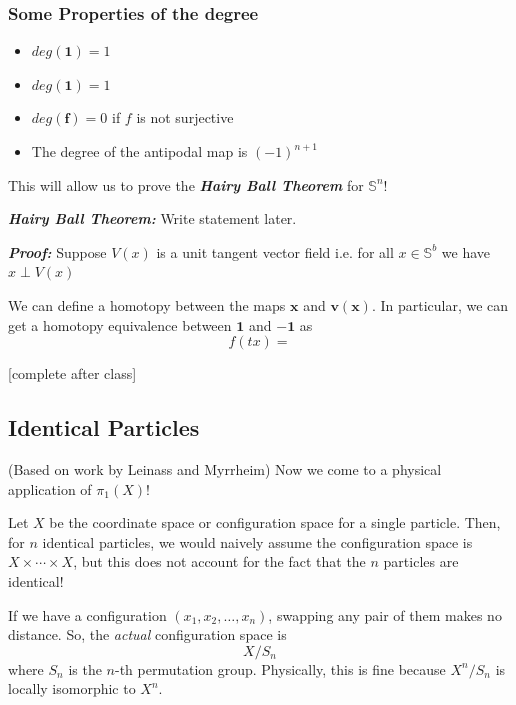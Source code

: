 \documentclass{article}
\begin{document}
\vskip 0.5cm
\subsubsection*{Some Properties of the degree}

\begin{itemize}
  \item $deg(\mathbf{1}) = 1$
  \item $deg(\mathbf{1}) = 1$
  \item $deg(\mathbf{f}) = 0$ if $f$ is not surjective
  \item The degree of the antipodal map is $(-1)^{n+1}$
\end{itemize}

\vskip 0.5cm
This will allow us to prove the \emph{\textbf{Hairy Ball Theorem}} for $\mathbb{S}^n$!

\vskip 0.5cm

\begin{dottedbox}
  \emph{\textbf{Hairy Ball Theorem:}} Write statement later.
\end{dottedbox}

\vskip 0.5cm
\emph{\textbf{Proof:}} Suppose $V(x)$ is a unit tangent vector field i.e. for all $x \in \mathbb{S}^b$ we have $x \perp V(x)$

\vskip 0.25cm
We can define a homotopy between the maps $\mathbf{x}$ and $\mathbf{v(x)}$. In particular, we can get a homotopy equivalence between $\mathbf{1}$ and $\mathbf{-1}$ as
\[ f(tx) =  \]

\vskip 0.5cm
[complete after class]

\vskip 1cm
\subsection{Identical Particles} (Based on work by Leinass and Myrrheim)
Now we come to a physical application of $\pi_1(X)$! 

\vskip 0.5cm
Let $X$ be the coordinate space or configuration space for a single particle. Then, for $n$ identical particles, we would naively assume the configuration space is $X \times \cdots \times X$, but this does not account for the fact that the $n$ particles are identical! 

\vskip 0.5cm
If we have a configuration $(x_1, x_2, \dots, x_n)$, swapping any pair of them makes no distance. So, the \emph{actual} configuration space is 
\[ X / S_n \]
where $S_n$ is the $n$-th permutation group. Physically, this is fine because $X^n / S_n$ is locally isomorphic to $X^n$.
\end{document}

